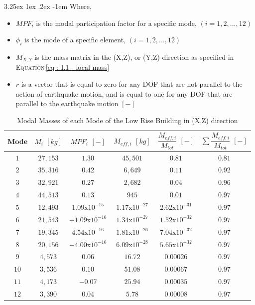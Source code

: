 \documentclass[11pt,a4paper,titlepage]{report}
\makeatletter
\renewcommand\paragraph{\@startsection{paragraph}{5}{\z@}%
  {3.25ex \@plus1ex \@minus.2ex}%
  {-1em}%
  {\normalfont\normalsize\bfseries}}
\makeatother
\begin{document}
\paragraph{}Where,
\begin{itemize}
    \item $MPF_i$ is the modal participation factor for a specific mode, $(i = 1,2,...,12)$
    \item $\phi_i$ is the mode of a specific element, $(i = 1,2,...,12)$
    \item $M_{X,Y}$ is the mass matrix in the (X,Z), or (Y,Z) direction as specified in \textsc{Equation}\,\eqref{eq : I.1 - local mass}
    \item $r$ is a vector that is equal to zero for any DOF that are not parallel to the action of earthquake motion, and is equal to one for any DOF that are parallel to the earthquake motion $[-]$
\end{itemize}
 \begin{table}[h]
 \begin{small}
    \centering
    \begin{tabular}{c|c|c|c|c|c}
        Mode & $M_i$ $[kg]$ & $MPF_i$ $[-]$ & $M_{eff,i}$ $[kg]$ & $\dfrac{M_{eff,i}}{M_{tot}}$ $[-]$ & $\sum\dfrac{M_{eff,i}}{M_{tot}}$ $[-]$\\
        \hline
       $1$ & $27,153$ & $1.30$ & $45,501$ & $0.81$ & $0.81$ \\
       $2$ & $35,316$ & $0.42$ & $6,649$ & $0.11$ & $0.92$\\
       $3$ & $32,921$ & $0.27$ & $2,682$ & $0.04$ & $0.96$\\
       $4$ & $44,513$ & $0.13$ & $945$ & $0.01$ & $0.97$\\
        $5$ & $12,493$ & $1.09$x$10^{-15}$ & $1.17$x$10^{-27}$ & $2.62$x$10^{-31}$ & $0.97$\\
       $6$ & $21,543$ & $-1.09$x$10^{-16}$ & $1.34$x$10^{-27}$ & $1.52$x$10^{-32}$ & $0.97$\\
       $7$ & $19,345$ & $4.54$x$10^{-16}$ & $1.81$x$10^{-26}$ & $7.04$x$10^{-32}$ & $0.97$\\
       $8$ & $20,156$ & $-4.00$x$10^{-16}$ & $6.09$x$10^{-28}$ & $5.65$x$10^{-32}$ & $0.97$\\
        $9$ & $4,573$ & $0.06$ & $16.72$ & $0.00026$ & $0.97$\\
       $10$ & $3,536$ & $0.10$ & $51.08$ & $0.00067$ & $0.97$\\
       $11$ & $4,173$ & $-0.07$ & $25.94$ & $0.00035$ & $0.97$\\
       $12$ & $3,390$ & $0.04$ & $5.78$ & $0.00008$ & $0.97$\\
    \end{tabular}
    \caption{Modal Masses of each Mode of the Low Rise Building in (X,Z) direction}
    \label{tab:low rise - modal properties x}
    \end{small}
\end{table}
\end{document}
